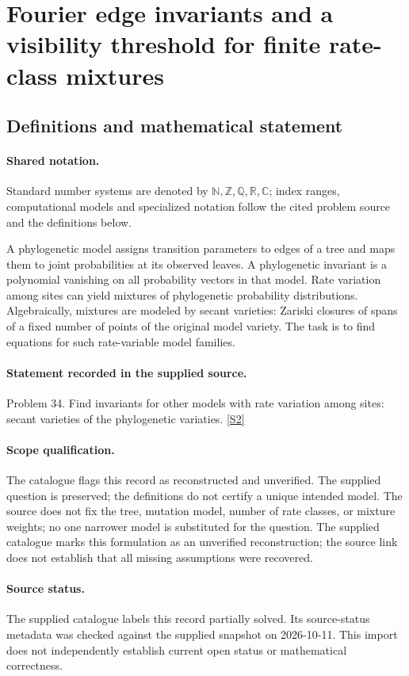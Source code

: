 \documentclass[11pt]{article}
\newcommand{\sref}[2]{\hyperlink{source:#1:#2}{[S#2]}}
\begin{document}
\section{Fourier edge invariants and a visibility threshold for finite rate-class mixtures}\label{statement}

\subsection{Definitions and mathematical statement}

\paragraph{Shared notation.}Standard number systems are denoted by $\mathbb N,\mathbb Z,\mathbb Q,\mathbb R,\mathbb C$; index ranges, computational models and specialized notation follow the cited problem source and the definitions below.


A phylogenetic model assigns transition parameters to edges of a tree and maps them to joint probabilities at its observed leaves. A phylogenetic invariant is a polynomial vanishing on all probability vectors in that model. Rate variation among sites can yield mixtures of phylogenetic probability distributions. Algebraically, mixtures are modeled by secant varieties: Zariski closures of spans of a fixed number of points of the original model variety. The task is to find equations for such rate-variable model families.
\paragraph{Statement recorded in the supplied source.}
Problem 34. Find invariants for other models with rate variation among sites: secant varieties of the phylogenetic variaties. \sref{statement}{2}
\paragraph{Scope qualification.}
The catalogue flags this record as reconstructed and unverified. The supplied question is preserved; the definitions do not certify a unique intended model. The source does not fix the tree, mutation model, number of rate classes, or mixture weights; no one narrower model is substituted for the question.
The supplied catalogue marks this formulation as an unverified reconstruction; the source link does not establish that all missing assumptions were recovered.
\paragraph{Source status.}
The supplied catalogue labels this record partially solved. Its source-status metadata was checked against the supplied snapshot on 2026-10-11. This import does not independently establish current open status or mathematical correctness.
\end{document}
